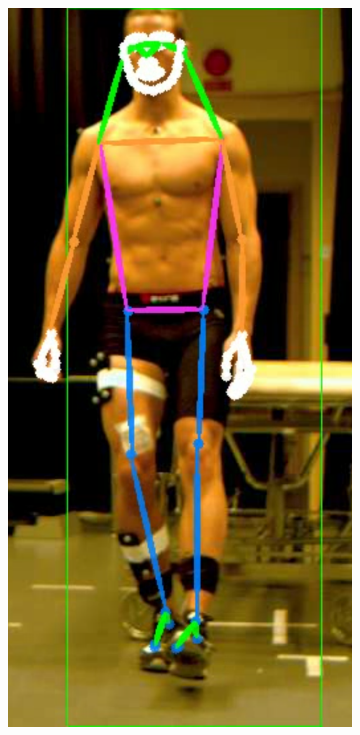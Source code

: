 {\begin{figure}[h]
\begin{subfigure}[t]{0.22\textwidth}
    \includegraphics[height=1.3\textwidth]{files/figs/res/hpe/36-3.png}
    \caption{}
  \end{subfigure}
  ~
  \begin{subfigure}[t]{0.22\textwidth}
    \centering

\end{subfigure}
\end{figure}}
